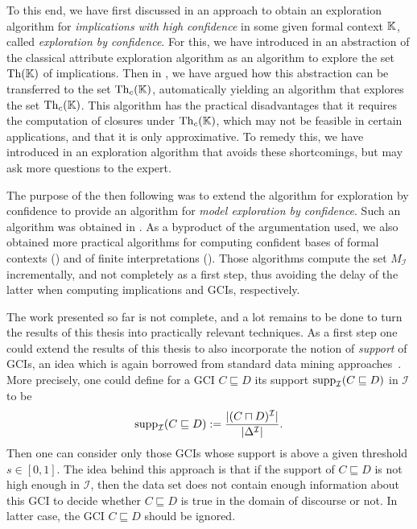 To this end, we have first discussed in  an approach to obtain an
exploration algorithm for \emph{implications with high confidence} in some given formal
context ${\mathbb{K}}$, called \emph{exploration by confidence}.  For this, we have introduced
in  an abstraction of the classical attribute exploration
algorithm as an algorithm to explore the set $\operatorname{Th}({\mathbb{K}})$ of implications.  Then in
, we have argued how this abstraction can be transferred to the set
$\operatorname{Th}_{c}({\mathbb{K}})$, automatically yielding an algorithm that explores the set $\operatorname{Th}_{c}({\mathbb{K}})$.  This algorithm has the practical disadvantages that it requires the computation of
closures under $\operatorname{Th}_{c}({\mathbb{K}})$, which may not be feasible in certain applications, and
that it is only approximative.  To remedy this, we have introduced in
 an exploration algorithm that avoids these shortcomings, but may
ask more questions to the expert.

The purpose of the then following  was to extend the algorithm
for exploration by confidence to provide an algorithm for \emph{model exploration by
  confidence}.  Such an algorithm was obtained in .  As a
byproduct of the argumentation used, we also obtained more practical algorithms for
computing confident bases of formal contexts () and of finite
interpretations ().  Those algorithms compute the set
$M_{\mathcal{I}}$ incrementally, and not completely as a first step, thus avoiding the
delay of the latter when computing implications and GCIs, respectively.

The work presented so far is not complete, and a lot remains to be done to turn the
results of this thesis into practically relevant techniques.  As a first step one could
extend the results of this thesis to also incorporate the notion of \emph{support} of
GCIs, an idea which is again borrowed from standard data mining
approaches~\cite{arules:agrawal:association-rules}.  More precisely, one could define for
a GCI $C \sqsubseteq D$ its support $\operatorname{supp}_{\mathcal{I}}(C \sqsubseteq D)$ in
$\mathcal{I}$ to be
\begin{equation*}
  \operatorname{supp}_{\mathcal{I}}( C \sqsubseteq D ) := \frac{ \lvert(C \sqcap D)^{\mathcal{I}}\rvert }{
    \lvert \Delta^{\mathcal{I}} \rvert }.
\end{equation*}
Then one can consider only those GCIs whose support is above a given threshold $s \in
[0,1]$.  The idea behind this approach is that if the support of $C \sqsubseteq D$ is not
high enough in $\mathcal{I}$, then the data set does not contain enough information about
this GCI to decide whether $C \sqsubseteq D$ is true in the domain of discourse or not.
In latter case, the GCI $C \sqsubseteq D$ should be ignored.

